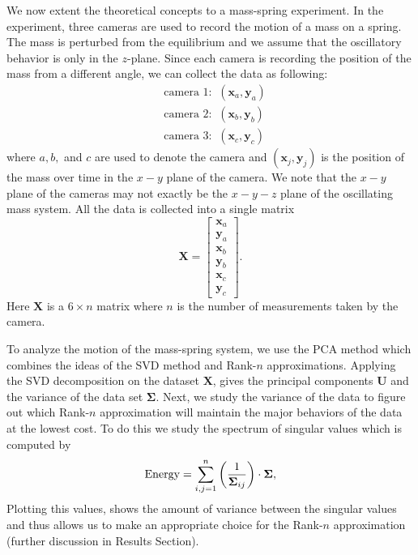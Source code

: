 \documentclass[12pt]{article}%
\begin{document}
We now extent the theoretical concepts to a mass-spring experiment. In the experiment, three cameras are used to record the motion of a mass on a spring. The mass is perturbed from the equilibrium and we assume that the oscillatory behavior is only in the $z$-plane. Since each camera is recording the position of the mass from a different angle, we can collect the data as following:
\begin{subequations}
    \begin{align}
        &\text{camera 1: } ~(\mathbf{x}_a, \mathbf{y}_a)\\
        &\text{camera 2: } ~(\mathbf{x}_b, \mathbf{y}_b)\\
        &\text{camera 3: } ~(\mathbf{x}_c, \mathbf{y}_c)
    \end{align}
\end{subequations}
where $a,b,$ and  $c$ are used to denote the camera and $(\mathbf{x}_j, \mathbf{y}_j)$ is the position of the mass over time in the $x-y$ plane of the camera. We note that the $x-y$ plane of the cameras may not exactly be the $x-y-z$ plane of the oscillating mass system. All the data is collected into a single matrix
\begin{equation} \label{big x}
    \mathbf{X} = \begin{bmatrix}
        \mathbf{x}_a\\
        \mathbf{y}_a\\
        \mathbf{x}_b\\
        \mathbf{y}_b\\
        \mathbf{x}_c\\
        \mathbf{y}_c
    \end{bmatrix}.
\end{equation}
Here $\mathbf{X}$ is a $6 \times n$ matrix where $n$ is the number of measurements taken by the camera. 

To analyze the motion of the mass-spring system, we use the PCA method which combines the ideas of the SVD method and Rank-$n$ approximations. Applying the SVD decomposition on the dataset $\mathbf{X}$, gives the principal components $\mathbf{U}$ and the variance of the data set $\mathbf{\Sigma}$. Next, we study the variance of the data to figure out which Rank-$n$ approximation will maintain the major behaviors of the data at the lowest cost. To do this we study the spectrum of singular values which is computed by
\begin{equation}\label{energy}
    \text{Energy} = \sum_{i,j = 1}^{n}{\left(\frac{1}{\mathbf{\Sigma}_{ij}}\right)} \cdot \mathbf{\Sigma},
\end{equation} 
Plotting this values, shows the amount of variance between the singular values and thus allows us to make an appropriate choice for the Rank-$n$ approximation (further discussion in Results Section).
\end{document}
